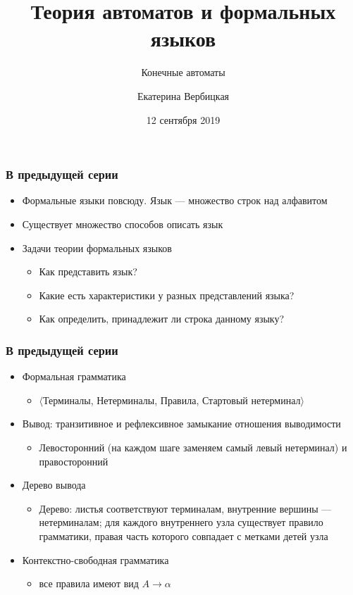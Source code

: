 \documentclass{beamer}
\title[]{Теория автоматов и формальных языков}
\subtitle[]{Конечные автоматы}
\institute[]{
Санкт-Петербургский государственный электротехнический университет <<ЛЭТИ>>\\
}
\author[]{Екатерина Вербицкая}
\date{12 сентября 2019}
\begin{document}
{
  \begin{frame}
    \titlepage
  \end{frame}
}

\begin{frame}[fragile]
  \transwipe[direction=90]
  \frametitle{В предыдущей серии}
  \begin{itemize}
    \item Формальные языки повсюду. Язык --- множество строк над алфавитом
    \item Существует множество способов описать язык
    \item Задачи теории формальных языков
    \begin{itemize}
      \item Как представить язык?
      \item Какие есть характеристики у разных представлений языка?
      \item Как определить, принадлежит ли строка данному языку?
    \end{itemize}
  \end{itemize}
\end{frame}

\begin{frame}[fragile]
  \transwipe[direction=90]
  \frametitle{В предыдущей серии}
  \begin{itemize}
    \item Формальная грамматика 
    \begin{itemize}
      \item $\langle$Терминалы, Нетерминалы, Правила, Стартовый нетерминал$\rangle$
    \end{itemize}
   \item Вывод: транзитивное и рефлексивное замыкание отношения выводимости
   \begin{itemize}
     \item Левосторонний (на каждом шаге заменяем самый левый нетерминал) и правосторонний
   \end{itemize}
   \item Дерево вывода
   \begin{itemize}
     \item Дерево: листья соответствуют терминалам, внутренние вершины --- нетерминалам; для каждого внутреннего узла существует правило грамматики, правая часть которого совпадает с метками детей узла
   \end{itemize}
    \item  Контекстно-свободная грамматика
      \begin{itemize}
        \item все правила имеют вид $A \rightarrow \alpha$
        
      \end{itemize}

      \end{itemize}

\end{frame}
\end{document}
